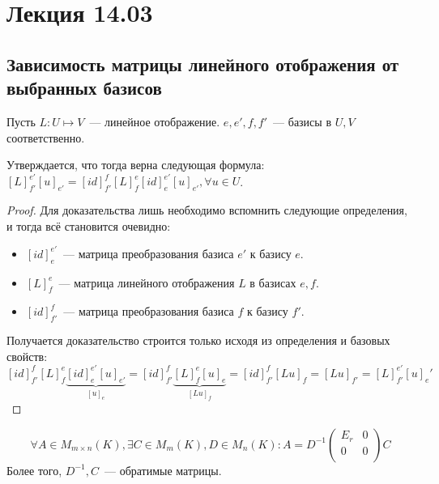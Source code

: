 \section{Лекция 14.03}
\subsection{Зависимость матрицы линейного отображения от выбранных базисов}
\begin{theorem}
    Пусть $L: U\mapsto V$~--- линейное отображение. 
    $e, e', f, f'$~--- базисы в $U, V$ соответственно.

    Утверждается, что тогда верна следующая формула:
    $[L]^{e'}_{f'}[u]_{e'}=[id]_{f'}^{f}[L]_f^{e}[id]_e^{e'}[u]_{e'}, \forall u\in U$.
\end{theorem}
\begin{proof}
    Для доказательства лишь необходимо вспомнить следующие определения, и тогда всё
    становится очевидно:
    \begin{itemize}
        \item $[id]_{e}^{e'}$~--- матрица преобразования базиса $e'$ к базису $e$.
        \item $[L]_f^e$~--- матрица линейного отображения $L$ в базисах $e,f$.
        \item $[id]_{f'}^f$~--- матрица преобразования базиса $f$ к базису $f'$.
    \end{itemize}
    Получается доказательство строится только исходя из определения и базовых
    свойств:
    \[
        [id]_{f'}^{f}[L]_f^{e}\underbrace{[id]_e^{e'}[u]_{e'}}_{[u]_e}=
        [id]_{f'}^{f}\underbrace{[L]_f^{e}[u]_e}_{[Lu]_f}=
        [id]_{f'}^{f}[Lu]_f=[Lu]_{f'}=[L]^{e'}_{f'}[u]_e'
    \]
\end{proof}
\begin{follow}
    $$\forall A\in M_{m\times n}(K),
    \exists C\in M_m(K), D\in M_n(K)\colon A = D^{-1}
    \left(\begin{array}{c|c}
            E_r & 0\\
            \hline
            0 & 0\\
    \end{array}\right) C$$
    Более того, $D^{-1}, C$~--- обратимые матрицы.
\end{follow}
